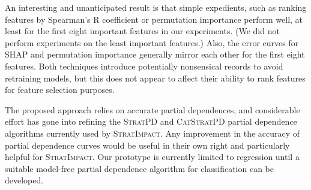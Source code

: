 \documentclass[11pt]{article}
\newcommand{\simp}{\fontfamily{cmr}\textsc{\small StratImpact}}
\newcommand{\spd}{\fontfamily{cmr}\textsc{\small StratPD}}
\newcommand{\cspd}{\fontfamily{cmr}\textsc{\small CatStratPD}}
\begin{document}
An interesting and unanticipated result is that simple expedients, such as ranking features by Spearman's R coefficient or permutation importance perform well, at least for the first eight important features in our experiments. (We did not perform experiments on the least important features.) Also, the error curves for SHAP and permutation importance generally mirror each other for the first eight features.  Both techniques introduce potentially nonsensical records to avoid retraining models, but this does not appear to affect their ability to rank features for feature selection purposes.

The proposed approach relies on accurate partial dependences, and considerable effort has gone into refining the \spd{} and \cspd{} partial dependence algorithms currently used by \simp.  Any improvement in the accuracy of partial dependence curves would be useful in their own right and particularly helpful for \simp.  Our prototype is currently limited to regression until a suitable model-free partial dependence algorithm for classification can be developed.
\end{document}
